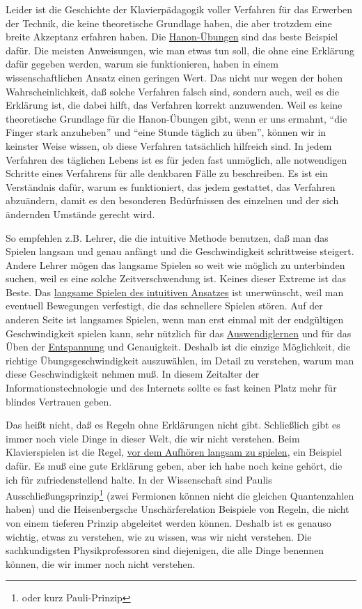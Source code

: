 Leider ist die Geschichte der Klavierpädagogik voller Verfahren für das Erwerben der Technik, die keine theoretische Grundlage haben, die aber trotzdem eine breite Akzeptanz erfahren haben.
Die \hyperref[c1iii7h]{Hanon-Übungen} sind das beste Beispiel dafür.
Die meisten Anweisungen, wie man etwas tun soll, die ohne eine Erklärung dafür gegeben werden, warum sie funktionieren, haben in einem wissenschaftlichen Ansatz einen geringen Wert.
Das nicht nur wegen der hohen Wahrscheinlichkeit, daß solche Verfahren falsch sind, sondern auch, weil es die Erklärung ist, die dabei hilft, das Verfahren korrekt anzuwenden.
Weil es keine theoretische Grundlage für die Hanon-Übungen gibt, wenn er uns ermahnt, \enquote{die Finger stark anzuheben} und \enquote{eine Stunde täglich zu üben}, können wir in keinster Weise wissen, ob diese Verfahren tatsächlich hilfreich sind.
In jedem Verfahren des täglichen Lebens ist es für jeden fast unmöglich, alle notwendigen Schritte eines Verfahrens für alle denkbaren Fälle zu beschreiben.
Es ist ein Verständnis dafür, warum es funktioniert, das jedem gestattet, das Verfahren abzuändern, damit es den besonderen Bedürfnissen des einzelnen und der sich ändernden Umstände gerecht wird.

So empfehlen z.B. Lehrer, die die intuitive Methode benutzen, daß man das Spielen langsam und genau anfängt und die Geschwindigkeit schrittweise steigert.
Andere Lehrer mögen das langsame Spielen so weit wie möglich zu unterbinden suchen, weil es eine solche Zeitverschwendung ist.
Keines dieser Extreme ist das Beste.
Das \hyperref[c1ii16]{langsame Spielen des intuitiven Ansatzes} ist unerwünscht, weil man eventuell Bewegungen verfestigt, die das schnellere Spielen stören.
Auf der anderen Seite ist langsames Spielen, wenn man erst einmal mit der endgültigen Geschwindigkeit spielen kann, sehr nützlich für das \hyperref[c1iii6h]{Auswendiglernen} und für das Üben der \hyperref[c1ii14]{Entspannung} und Genauigkeit.
Deshalb ist die einzige Möglichkeit, die richtige Übungsgeschwindigkeit auszuwählen, im Detail zu verstehen, warum man diese Geschwindigkeit nehmen muß.
In diesem Zeitalter der Informationstechnologie und des Internets sollte es fast keinen Platz mehr für blindes Vertrauen geben.

Das heißt nicht, daß es Regeln ohne Erklärungen nicht gibt.
Schließlich gibt es immer noch viele Dinge in dieser Welt, die wir nicht verstehen.
Beim Klavierspielen ist die Regel, \hyperref[c1ii17]{vor dem Aufhören langsam zu spielen}, ein Beispiel dafür.
Es muß eine gute Erklärung geben, aber ich habe noch keine gehört, die ich für zufriedenstellend halte.
In der Wissenschaft sind Paulis Ausschließungsprinzip\footnote{oder kurz Pauli-Prinzip} (zwei Fermionen können nicht die gleichen Quantenzahlen haben) und die Heisenbergsche Unschärferelation Beispiele von Regeln, die nicht von einem tieferen Prinzip abgeleitet werden können.
Deshalb ist es genauso wichtig, etwas zu verstehen, wie zu wissen, was wir nicht verstehen.
Die sachkundigsten Physikprofessoren sind diejenigen, die alle Dinge benennen können, die wir immer noch nicht verstehen.


